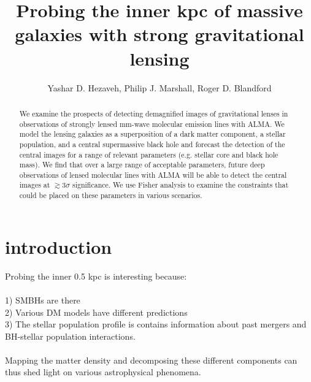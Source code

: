 \documentclass[chicago]{emulateapj}
\begin{document}
\title{Probing the inner kpc of massive galaxies with strong gravitational lensing}
\author{Yashar D. Hezaveh, Philip J. Marshall, Roger D. Blandford}  

\begin{abstract}  
\noindent
We examine the prospects of detecting demagnified images of gravitational lenses in observations of strongly lensed mm-wave molecular emission lines with ALMA. We model the lensing galaxies as a superposition of a dark matter component, a stellar population, and a central supermassive black hole and forecast the detection of the central images for a range of relevant parameters (e.g. stellar core and black hole mass).
We find that over a large range of acceptable parameters, future deep observations of lensed molecular lines with ALMA will be able to detect the central images at $\gtrsim 3\sigma$ significance. We use Fisher analysis to examine the  constraints that could be placed on these parameters in various scenarios. 

\end{abstract}






\section{introduction}
\begin{framed}
Probing the inner 0.5 kpc is interesting because: \\ \\1) SMBHs are there \\2) Various DM models have different predictions \\3) The stellar population profile is contains information about past mergers and BH-stellar population interactions. 
\\
\\
Mapping the matter density and decomposing these different components can thus shed light on various astrophysical phenomena.
\end{framed}
\end{document}
